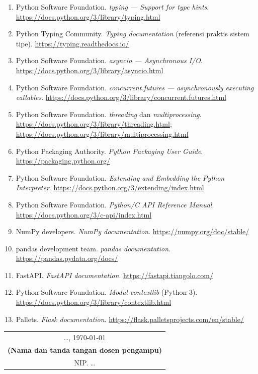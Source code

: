 \documentclass[12pt,a4paper]{article}
\begin{document}
\begin{enumerate}[leftmargin=*]
  \item Python Software Foundation. \textit{typing --- Support for type hints}. \url{https://docs.python.org/3/library/typing.html}

  \item Python Typing Community. \textit{Typing documentation} (referensi praktis sistem tipe). \url{https://typing.readthedocs.io/}

  \item Python Software Foundation. \textit{asyncio --- Asynchronous I/O}. \url{https://docs.python.org/3/library/asyncio.html}

  \item Python Software Foundation. \textit{concurrent.futures --- asynchronously executing callables}. \url{https://docs.python.org/3/library/concurrent.futures.html}

  \item Python Software Foundation. \textit{threading} dan \textit{multiprocessing}. \url{https://docs.python.org/3/library/threading.html}; \url{https://docs.python.org/3/library/multiprocessing.html}

  \item Python Packaging Authority. \textit{Python Packaging User Guide}. \url{https://packaging.python.org/}

  \item Python Software Foundation. \textit{Extending and Embedding the Python Interpreter}. \url{https://docs.python.org/3/extending/index.html}

  \item Python Software Foundation. \textit{Python/C API Reference Manual}. \url{https://docs.python.org/3/c-api/index.html}

  \item NumPy developers. \textit{NumPy documentation}. \url{https://numpy.org/doc/stable/}

  \item pandas development team. \textit{pandas documentation}. \url{https://pandas.pydata.org/docs/}

  \item FastAPI. \textit{FastAPI documentation}. \url{https://fastapi.tiangolo.com/}

  \item Python Software Foundation. \textit{Modul contextlib} (Python 3). \url{https://docs.python.org/3/library/contextlib.html}

  \item Pallets. \textit{Flask documentation}. \url{https://flask.palletsprojects.com/en/stable/}
\end{enumerate}

\vspace{1cm}

\begin{flushright}
\begin{tabular}{c}
\ldots, \today \\[2cm]
\textbf{(Nama dan tanda tangan dosen pengampu)}\\
NIP. \ldots
\end{tabular}
\end{flushright}
\end{document}
